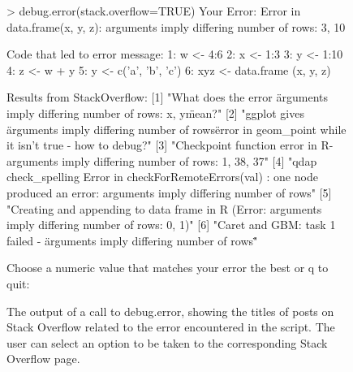 \begin{figure}[t]
\begin{example}
> debug.error(stack.overflow=TRUE)
Your Error: Error in data.frame(x, y, z): arguments imply differing number 
of rows: 3, 10

Code that led to error message:
1: 	 w <- 4:6 
2: 	 x <- 1:3 
3: 	 y <- 1:10 
4: 	 z <- w + y 
5: 	 y <- c('a', 'b', 'c') 
6: 	 xyz <- data.frame (x, y, z) 

Results from StackOverflow:
[1] "What does the error \"arguments imply differing number of rows: x, y\" 
    mean?"                                                 
[2] "ggplot gives \"arguments imply differing number of rows\" error in 
    geom_point while it isn't true - how to debug?"            
[3] "Checkpoint function error in R- arguments imply differing number of rows: 
    1, 38, 37"                                          
[4] "qdap check_spelling Error in checkForRemoteErrors(val) : one node 
    produced an error: arguments imply differing number of rows"
[5] "Creating and appending to data frame in R (Error: arguments imply 
    differing number of rows: 0, 1)"                            
[6] "Caret and GBM: task 1 failed - \"arguments imply differing number of rows\""                                                  

Choose a numeric value that matches your error the best or q to quit: 
\end{example}
\caption{The output of a call to debug.error, showing the titles of posts on Stack Overflow related to the error encountered in the script.  The user can select an option to be taken to the corresponding Stack Overflow page.}
\label{listing:stack-overflow}
\end{figure}

%
%

